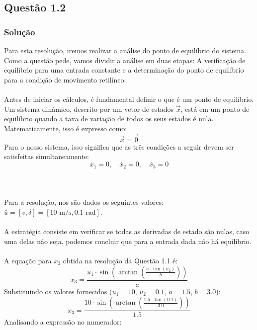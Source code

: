 \documentclass[a4paper,11pt]{article}
\begin{document}
\subsection*{\sc Questão 1.2}

\subsubsection*{\sc Solução}

Para esta resolução, iremos realizar a análise do ponto de equilíbrio do sistema. Como a questão pede, vamos dividir a análise em duas etapas: A verificação de equilíbrio para uma entrada constante e a determinação do ponto de equilíbrio para a condição de movimento retilíneo.
\\\\
Antes de iniciar os cálculos, é fundamental definir o que é um ponto de equilíbrio. Um sistema dinâmico, descrito por um vetor de estados $\vec{x}$, está em um ponto de equilíbrio quando a taxa de variação de todos os seus estados é nula. Matematicamente, isso é expresso como:
\begin{equation}
    \dot{\vec{x}} = \vec{0}
\end{equation}
Para o nosso sistema, isso significa que as três condições a seguir devem ser satisfeitas simultaneamente:
$$ \dot{x_1} = 0, \quad \dot{x_2} = 0, \quad \dot{x_3} = 0 $$
\\\\\\ 
Para a resolução, nos são dados os seguintes valores: $\bar{u} = [v, \delta] = [10 \text{ m/s}, 0.1 \text{ rad}]$.
\\\\
A estratégia consiste em verificar se todas as derivadas de estado são nulas, caso uma delas não seja, podemos concluir que para a entrada dada não há equilíbrio.
\\\\
A equação para $\dot{x_3}$ obtida na resolução da Questão 1.1 é:
\begin{equation} \label{eq:x3_dot}
    \dot{x_3} = \frac{u_1 \cdot \sin\left(\arctan\left(\frac{a \cdot \tan(u_2)}{b}\right)\right)}{a}
\end{equation}
Substituindo os valores fornecidos ($u_1 = 10$, $u_2 = 0.1$, $a = 1.5$, $b = 3.0$):
\begin{equation}
    \dot{x_3} = \frac{10 \cdot \sin\left(\arctan\left(\frac{1.5 \cdot \tan(0.1)}{3.0}\right)\right)}{1.5}
\end{equation}
Analisando a expressão no numerador:
\end{document}
